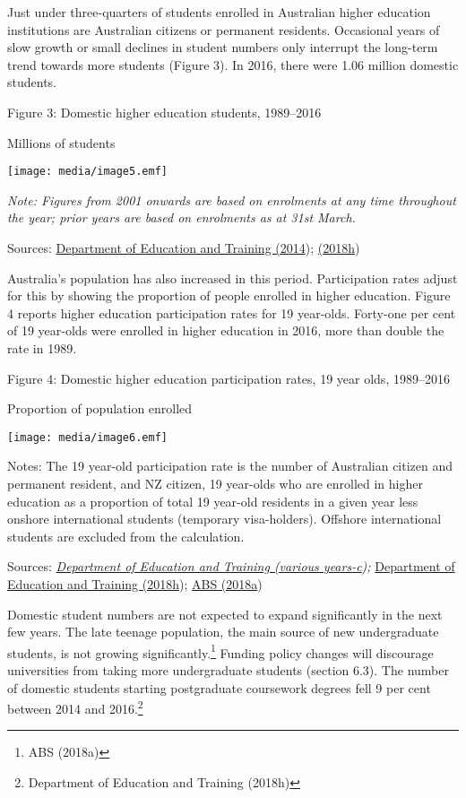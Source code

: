 \documentclass[]{book}
\begin{document}
Just under three-quarters of students enrolled in Australian higher education institutions are Australian citizens or permanent residents. Occasional years of slow growth or small declines in student numbers only interrupt the long-term trend towards more students (Figure 3). In 2016, there were 1.06 million domestic students.

\protect\hypertarget{_Ref383097604}{}{}Figure 3: Domestic higher education students, 1989--2016

Millions of students

\texttt{[image: media/image5.emf]}

\emph{Note: Figures from 2001 onwards are based on enrolments at any time throughout the year; prior years are based on enrolments as at 31st March.}

Sources: \protect\hyperlink{_ENREF_60}{Department of Education and Training (2014}); \protect\hyperlink{_ENREF_87}{(2018h})

Australia's population has also increased in this period. Participation rates adjust for this by showing the proportion of people enrolled in higher education. Figure 4 reports higher education participation rates for 19 year-olds. Forty-one per cent of 19 year-olds were enrolled in higher education in 2016, more than double the rate in 1989.

\protect\hypertarget{_Ref311634930}{}{}Figure 4: Domestic higher education participation rates, 19 year olds, 1989--2016

Proportion of population enrolled

\texttt{[image: media/image6.emf]}

Notes: The 19 year-old participation rate is the number of Australian citizen and permanent resident, and NZ citizen, 19 year-olds who are enrolled in higher education as a proportion of total 19 year-old residents in a given year less onshore international students (temporary visa-holders). Offshore international students are excluded from the calculation.

Sources: \emph{\protect\hyperlink{_ENREF_114}{Department of Education and Training (various years-c});} \protect\hyperlink{_ENREF_87}{Department of Education and Training (2018h}); \protect\hyperlink{_ENREF_8}{ABS (2018a})

Domestic student numbers are not expected to expand significantly in the next few years. The late teenage population, the main source of new undergraduate students, is not growing significantly.\footnote{ABS (2018a)} Funding policy changes will discourage universities from taking more undergraduate students (section 6.3). The number of domestic students starting postgraduate coursework degrees fell 9 per cent between 2014 and 2016.\footnote{Department of Education and Training (2018h)}
\end{document}
